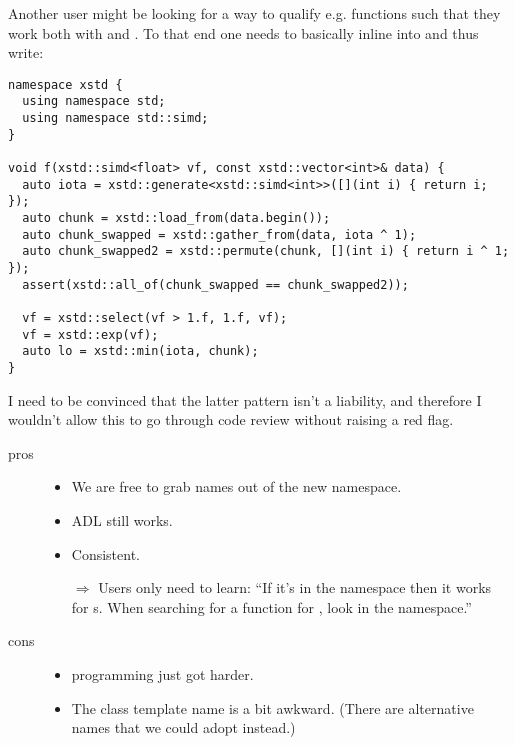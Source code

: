 Another user might be looking for a way to qualify e.g. 
functions such that they work both with  and \simdT.
To that end one needs to basically inline \std{} into  and
thus write:
\medskip\begin{lstlisting}[style=Vc]
namespace xstd {
  using namespace std;
  using namespace std::simd;
}

void f(xstd::simd<float> vf, const xstd::vector<int>& data) {
  auto iota = xstd::generate<xstd::simd<int>>([](int i) { return i; });
  auto chunk = xstd::load_from(data.begin());
  auto chunk_swapped = xstd::gather_from(data, iota ^ 1);
  auto chunk_swapped2 = xstd::permute(chunk, [](int i) { return i ^ 1; });
  assert(xstd::all_of(chunk_swapped == chunk_swapped2));

  vf = xstd::select(vf > 1.f, 1.f, vf);
  vf = xstd::exp(vf);
  auto lo = xstd::min(iota, chunk);
}
\end{lstlisting}

I need to be convinced that the latter pattern isn't a liability, and
therefore I wouldn't allow this to go through code review without raising a
red flag.

\begin{description}
  \item[pros]
    \begin{itemize}
      \item We are free to grab names out of the new namespace.
      \item ADL still works.
      \item Consistent.
      \item[$\Rightarrow$] Users only need to learn: “If it's in the
        \std{} namespace then it works for s.
        When searching for a function for , look in the
        \std{} namespace.”
    \end{itemize}

  \item[cons]
    \begin{itemize}
      \item \simdgeneric programming just got harder.
      \item The class template name \std{} is a bit awkward.
        (There are alternative names that we could adopt instead.)
    \end{itemize}
\end{description}

